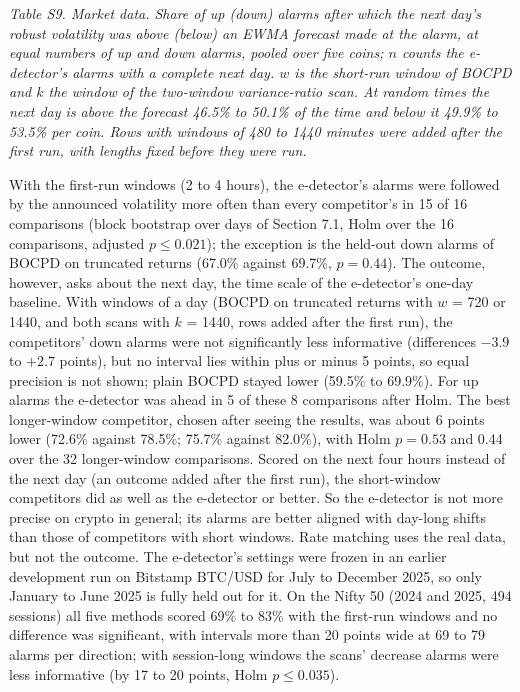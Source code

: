 \documentclass[
]{article}
\begin{document}
\emph{Table S9. Market data. Share of up (down) alarms after which the
next day's robust volatility was above (below) an EWMA forecast made at
the alarm, at equal numbers of up and down alarms, pooled over five
coins; \(n\) counts the e-detector's alarms with a complete next day.
\(w\) is the short-run window of BOCPD and \(k\) the window of the
two-window variance-ratio scan. At random times the next day is above
the forecast 46.5\% to 50.1\% of the time and below it 49.9\% to 53.5\%
per coin. Rows with windows of 480 to 1440 minutes were added after the
first run, with lengths fixed before they were run.}

With the first-run windows (2 to 4 hours), the e-detector's alarms were
followed by the announced volatility more often than every competitor's
in 15 of 16 comparisons (block bootstrap over days of Section 7.1, Holm
over the 16 comparisons, adjusted \(p \le 0.021\)); the exception is the
held-out down alarms of BOCPD on truncated returns (67.0\% against
69.7\%, \(p = 0.44\)). The outcome, however, asks about the next day,
the time scale of the e-detector's one-day baseline. With windows of a
day (BOCPD on truncated returns with \(w\) = 720 or 1440, and both scans
with \(k\) = 1440, rows added after the first run), the competitors'
down alarms were not significantly less informative (differences
\(-3.9\) to \(+2.7\) points), but no interval lies within plus or minus
5 points, so equal precision is not shown; plain BOCPD stayed lower
(59.5\% to 69.9\%). For up alarms the e-detector was ahead in 5 of these
8 comparisons after Holm. The best longer-window competitor, chosen
after seeing the results, was about 6 points lower (72.6\% against
78.5\%; 75.7\% against 82.0\%), with Holm \(p = 0.53\) and 0.44 over the
32 longer-window comparisons. Scored on the next four hours instead of
the next day (an outcome added after the first run), the short-window
competitors did as well as the e-detector or better. So the e-detector
is not more precise on crypto in general; its alarms are better aligned
with day-long shifts than those of competitors with short windows. Rate
matching uses the real data, but not the outcome. The e-detector's
settings were frozen in an earlier development run on Bitstamp BTC/USD
for July to December 2025, so only January to June 2025 is fully held
out for it. On the Nifty 50 (2024 and 2025, 494 sessions) all five
methods scored 69\% to 83\% with the first-run windows and no difference
was significant, with intervals more than 20 points wide at 69 to 79
alarms per direction; with session-long windows the scans' decrease
alarms were less informative (by 17 to 20 points, Holm \(p \le 0.035\)).
\end{document}

